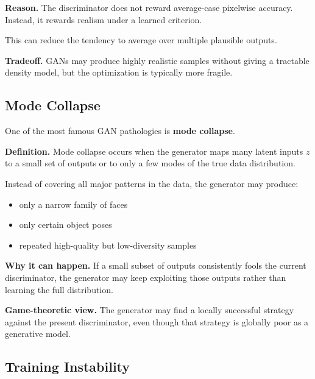 \medskip

\noindent
\textbf{Reason.}
The discriminator does not reward average-case pixelwise accuracy. Instead, it rewards realism under a learned criterion.

\medskip

\noindent
This can reduce the tendency to average over multiple plausible outputs.

\medskip

\noindent
\textbf{Tradeoff.}
GANs may produce highly realistic samples without giving a tractable density model, but the optimization is typically more fragile.

\subsection{Mode Collapse}

One of the most famous GAN pathologies is \textbf{mode collapse}.

\medskip

\noindent
\textbf{Definition.}
Mode collapse occurs when the generator maps many latent inputs $z$ to a small set of outputs or to only a few modes of the true data distribution.

\medskip

\noindent
Instead of covering all major patterns in the data, the generator may produce:
\begin{itemize}
    \item only a narrow family of faces
    \item only certain object poses
    \item repeated high-quality but low-diversity samples
\end{itemize}

\medskip

\noindent
\textbf{Why it can happen.}
If a small subset of outputs consistently fools the current discriminator, the generator may keep exploiting those outputs rather than learning the full distribution.

\medskip

\noindent
\textbf{Game-theoretic view.}
The generator may find a locally successful strategy against the present discriminator, even though that strategy is globally poor as a generative model.

\subsection{Training Instability}

